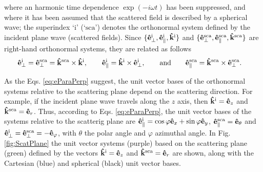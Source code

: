 %
where an harmonic time dependence $\exp(-i\omega t)$ has been suppressed, and where it has been assumed that the scattered field is described by a spherical wave; the superindex `$\text{i}$' (`$\text{sca}$') denotes the orthonormal system defined by the incident plane wave (scattered fields).  Since $\{\vu{e}_\perp^\text{i}, \vu{e}_\parallel^\text{i},\vu{k}^\text{i} \}$ and $\{\vu{e}_\perp^\text{sca}, \vu{e}_\parallel^\text{sca},\vu{k}^\text{sca} \}$ are right-hand orthonormal systems, they are related as follows
%
 \begin{align}
	\vu{e}_\perp^\text{i} = \vu{e}_\perp^\text{sca}  & =  \vu{k}^\text{sca} \times \vu{k}^\text{i},
		\qquad
	\vu{e}^\text{i}_\parallel = \vu{k}^\text{i}\times \vu{e}^\text{i}_\perp,
		\qquad\text{and}\qquad
	\vu{e}^\text{sca}_\parallel = \vu{k}^\text{sca} \times \vu{e}_\perp^\text{sca}.
 \label{eq:eParaPerp}
 \end{align}
%

As the Eqs. \eqref{eq:eParaPerp} suggest, the unit vector bases of the orthonormal systems relative to the scattering plane depend on the scattering direction. For example, if the incident plane wave travels along the $z$ axis, then $\vu{k}^\text{i} = \vu{e}_z$ and $\vu{k}^\text{sca} = \vu{e}_r$. Thus, according to Eqs. \eqref{eq:eParaPerp}, the unit vector bases of the systems relative to the scatterig plane are   $\vu{e}_\parallel^\text{i} = \cos\varphi \vu{e}_x +\sin\varphi \vu{e}_y$, $\vu{e}_\parallel^\text{sca} = \vu{e}_\theta$ and $\vu{e}_\perp^\text{i} = \vu{e}_\perp^\text{sca}  = - \vu{e}_\varphi$, with $\theta$ the polar angle and $\varphi$ azimuthal angle. In Fig. \ref{fig:ScatPlane} the unit vector systems (purple) based on the  scattering plane  (green) defined by the vectors $\vu{k}^\text{i}=\vu{e}_z$ and $\vu{k}^\text{sca} = \vu{e}_r$ are shown, along with the Cartesian (blue) and spherical (black) unit vector bases.

